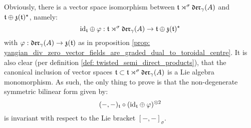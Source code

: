         \begin{remark}
            Obviously, there is a vector space isomorphism between $\mathfrak{t} \rtimes^{\sigma} \mathfrak{der}_{\gamma}(A)$ and $\mathfrak{t} \oplus \mathfrak{z}(\mathfrak{t})^{\star}$, namely:
                $$\mathrm{id}_{\mathfrak{t}} \oplus \varphi: \mathfrak{t} \rtimes^{\sigma} \mathfrak{der}_{\gamma}(A) \to \mathfrak{t} \oplus \mathfrak{z}(\mathfrak{t})^{\star}$$
            with $\varphi: \mathfrak{der}_{\gamma}(A) \to \mathfrak{z}(\mathfrak{t})$ as in proposition \ref{prop: yangian_div_zero_vector_fields_are_graded_dual_to_toroidal_centre}. It is also clear (per definition \ref{def: twisted_semi_direct_products}), that the canonical inclusion of vector spaces $\mathfrak{t} \subset \mathfrak{t} \rtimes^{\sigma} \mathfrak{der}_{\gamma}(A)$ is a Lie algebra monomorphism. As such, the only thing to prove is that the non-degenerate symmetric bilinear form given by:
                $$(-, -)_{\toroidal} \circ (\id_{\toroidal} \oplus \varphi)^{\tensor 2}$$
            is invariant with respect to the Lie bracket $[-, -]_{\sigma}$.
        \end{remark}

